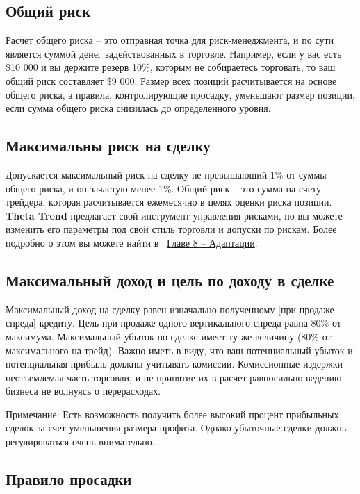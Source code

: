 \documentclass[12pt,DIV=18]{scrartcl}
\begin{document}
\subsection{Общий риск}
Расчет общего риска -- это отправная точка для риск-менеджмента, и по сути является суммой денег задействованных в торговле. Например, если у вас есть \$10 000 и вы держите резерв 10\%, которым не собираетесь торговать, то ваш общий риск составляет \$9 000. Размер всех позиций расчитывается на основе общего риска, а правила, контролирующие просадку, уменьшают размер позиции, если сумма общего риска снизилась до определенного уровня.

\subsection{Максимальны риск на сделку}
Допускается максимальный риск на сделку не превышающий 1\% от суммы общего риска, и он зачастую менее 1\%. Общий риск -- это сумма на счету трейдера, которая расчитывается ежемесячно в целях оценки риска позиции. \textbf{Theta Trend} предлагает свой инструмент управления рисками, но вы можете изменить его параметры под свой стиль торговли и допуски по рискам. Более подробно о этом вы можете найти в ~\hyperref[chapter8]{\ul{Главе 8} -- Адаптации}.

\subsection{Максимальный доход и цель по доходу в сделке}
Максимальный доход на сделку равен изначально полученному [при продаже спреда] кредиту. Цель при продаже одного вертикального спреда равна 80\% от максимума. Максимальный убыток по сделке имеет ту же величину (80\% от максимального на трейд). Важно иметь в виду, что ваш потенциальный убыток и потенциальная прибыль должны учитывать комиссии. Комиссионные издержки неотъемлемая часть торговли, и не принятие их в расчет равносильно ведению бизнеса не волнуясь о перерасходах.

\bigskip

Примечание: Есть возможность получить более высокий процент прибыльных сделок за счет уменьшения размера профита. Однако убыточные сделки должны регулироваться очень внимательно.

\subsection{Правило просадки}
\end{document}

